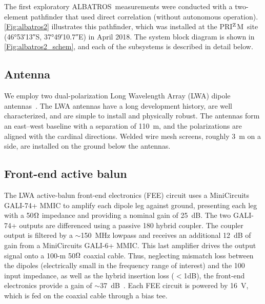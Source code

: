 \documentclass{ws-jai}
\def\albatros{ALBATROS}
\def\prizm{PRI$^{\rm Z}$M}
\begin{document}
The first exploratory \albatros\ measurements were conducted with a
two-element pathfinder that used direct correlation (without
autonomous operation).  \autoref{Fig:albatros2} illustrates this
pathfinder, which was installed at the \prizm\ site (\ang{46;53;13}S,
\ang{37;49;10.7}E) in April 2018.  The system block diagram is shown
in \autoref{Fig:albatros2_schem}, and each of the subsystems is
described in detail below.

\subsection{Antenna}	

We employ two dual-polarization Long Wavelength Array (LWA) dipole
antennas~\citep{Memo28}.  The LWA antennas have a long development
history, are well characterized, and are simple to install and
physically robust.  The antennas form an east--west baseline with a
separation of \SI{110}{m}, and the polarizations are aligned with the
cardinal directions.  Welded wire mesh screens, roughly 3~m on a side,
are installed on the ground below the antennas.

\subsection{Front-end active balun}\label{section:FEE}

The LWA active-balun front-end electronics (FEE) circuit uses a
MiniCircuits GALI-74+ MMIC to amplify each dipole leg against ground,
presenting each leg with a 50$\ohm$ impedance and providing a nominal
gain of 25~dB. The two GALI-74+ outputs are differenced using a
passive {180\degree} hybrid coupler. The coupler output is filtered by
a $\sim$150~MHz lowpass and receives an additional 12~dB of gain from
a MiniCircuits GALI-6+ MMIC. This last amplifier drives the output
signal onto a 100-m 50$\ohm$ coaxial cable. Thus, neglecting mismatch
loss between the dipoles (electrically small in the frequency range of
interest) and the 100{\ohm} input impedance, as well as the hybrid
insertion loss ($<$1dB), the front-end electronics provide a gain of
$\sim$37~dB~\citep{2012PASP..124.1090H}.  Each FEE circuit is powered
by 16~V, which is fed on the coaxial cable through a bias tee.

\end{document}
